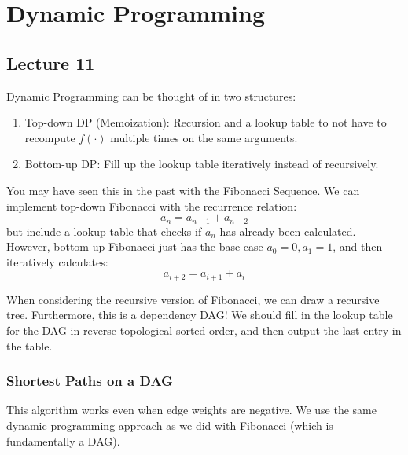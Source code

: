 \section{Dynamic Programming}

\subsection{Lecture 11}
Dynamic Programming can be thought of in
two structures:

\begin{enumerate}
    \item Top-down DP (Memoization): Recursion and a lookup table to not have to recompute $f(\cdot)$ multiple times on
    the same arguments.
    \item Bottom-up DP: Fill up the lookup table iteratively instead of recursively.
\end{enumerate}

You may have seen this in the past with the Fibonacci Sequence. We can implement top-down Fibonacci with the recurrence relation:
\[ a_n = a_{n - 1} + a_{n - 2} \]
but include a lookup table that checks if $a_n$ has already been calculated. However, bottom-up Fibonacci
just has the base case $a_0 = 0, a_1 = 1$, and then iteratively calculates:
\[ a_{i + 2} = a_{i + 1} + a_i \]

When considering the recursive version of Fibonacci, we can draw a recursive tree. Furthermore, this is a dependency DAG!
We should fill in the lookup table for the DAG in reverse topological sorted order, and then output the last entry in the table.

\subsubsection{Shortest Paths on a DAG}
This algorithm works even when edge weights are negative. We use the same dynamic programming approach as we did with
Fibonacci (which is fundamentally a DAG).

